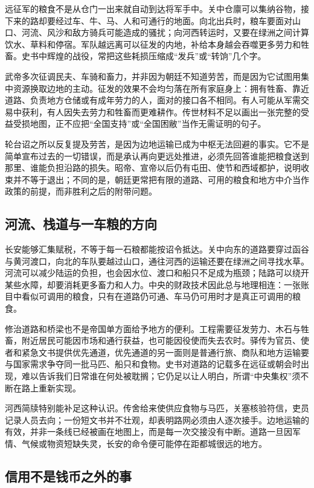 远征军的粮食不是从仓门一出来就自动到达将军手中。关中仓廪可以集纳谷物，接下来的路却要经过车、牛、马、人和可通行的地面。向北出兵时，粮车要面对山口、河流、风沙和敌方骑兵可能造成的骚扰；向河西转运时，又要在绿洲之间计算饮水、草料和停宿。军队越远离可以征发的内地，补给本身越会吞噬更多劳力和牲畜。史书中辉煌的战役，常把这些耗损压缩成“发兵”或“转饷”几个字。

武帝多次征调民夫、车骑和畜力，并非因为朝廷不知道劳苦，而是因为它试图用集中资源换取边地的主动。征发的效果不会均匀落在所有家庭身上：拥有牲畜、靠近道路、负责地方仓储或有成年劳力的人，面对的接口各不相同。有人可能从军需交易中获利，有人因失去劳力和牲畜而更难耕作。传世材料不足以画出一张完整的受益受损地图，正不应把“全国支持”或“全国困敝”当作无需证明的句子。

轮台诏之所以反复提及劳苦，是因为边地运输已成为中枢无法回避的事实。它不是简单宣布过去的一切错误，而是承认再向更远处推进，必须先回答谁能把粮食送到那里、谁能负担沿路的损失。昭帝、宣帝以后仍有屯田、使节和西域都护，说明收束并不等于退出；不同的是，朝廷更常把有限的道路、可用的粮食和地方中介当作政策的前提，而非胜利之后的附带问题。

\subsection{河流、栈道与一车粮的方向}

长安能够汇集赋税，不等于每一石粮都能按诏令抵达。关中向东的道路要穿过函谷与黄河渡口，向北的车队要越过山口，通往河西的运输还要在绿洲之间寻找水草。河流可以减少陆运的负担，也会因水位、渡口和船只不足成为瓶颈；陆路可以绕开某些水障，却要消耗更多畜力和人力。中央的财政技术因此总与地理相连：一张账目中看似可调用的粮食，只有在道路仍可通、车马仍可用时才是真正可调用的粮食。

修治道路和桥梁也不是帝国单方面给予地方的便利。工程需要征发劳力、木石与牲畜，附近居民可能因市场和通行获益，也可能因役使而失去农时。驿传为官员、使者和紧急文书提供优先通道，优先通道的另一面则是普通行旅、商队和地方运输要与国家需求争夺同一批马匹、船只和食物。史书对道路的记载多在远征或朝会时出现，难以告诉我们日常谁在何处被耽搁；它仍足以让人明白，所谓“中央集权”须不断在路上重新实现。

河西简牍特别能补足这种认识。传舍给来使供应食物与马匹，关塞核验符信，吏员记录人员去向；一份短文书并不壮观，却表明路网必须由人逐次接手。边地运输的有效，并非一条线已经被画在地图上，而是每一次交接没有中断。道路一旦因军情、气候或物资短缺失灵，长安的命令便可能停在距都城很远的地方。

\subsection{信用不是钱币之外的事}

